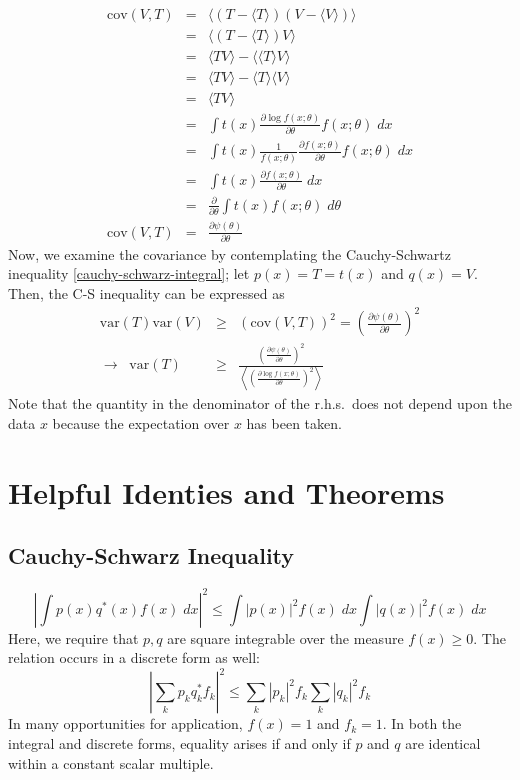 \begin{eqnarray}
\textrm{cov}(V,T) &=& \langle (T - \langle T \rangle)(V - \langle V
\rangle)\rangle \\
&=& \langle (T - \langle T \rangle) V\rangle \\
&=& \langle T V \rangle - \langle \langle T \rangle V\rangle \\
&=& \langle T V \rangle - \langle T \rangle \langle V\rangle \\
&=& \langle T V \rangle \\
&=& \int t(x) \frac{\partial \log f(x; \theta)}{\partial \theta} f(x;
\theta)\; dx \\
&=& \int t(x) \frac{1}{f(x; \theta)} \frac{\partial f(x;
  \theta)}{\partial \theta} f(x; \theta) \; dx \\
&=& \int t(x) \frac{\partial f(x; \theta)}{\partial \theta} \; dx \\
&=& \frac{\partial}{\partial \theta} \int t(x) f(x; \theta) \; d\theta \\
\textrm{cov}(V,T) &=& \frac{\partial \psi(\theta)}{\partial \theta}
\end{eqnarray}
Now, we examine the covariance by contemplating the Cauchy-Schwartz
inequality \eqref{cauchy-schwarz-integral}; let $p(x) = T = t(x)$ and
$q(x) = V$.  Then, the C-S inequality can be expressed as
\begin{eqnarray}
\textrm{var}(T) \textrm{var}(V) &\ge& \left(\textrm{cov}(V,T)\right)^2
= \left(\frac{\partial \psi(\theta)}{\partial \theta} \right)^2 \\
\rightarrow \;\; \textrm{var}(T) &\ge& 
\frac{\left(\frac{\partial \psi(\theta)}{\partial \theta}\right)^2}
     {\left\langle \left(\frac{\partial \log f(x; \theta)}{\partial \theta}\right)^2\right\rangle}
\end{eqnarray}
Note that the quantity in the denominator of the r.h.s.~does not
depend upon the data $x$ because the expectation over $x$ has been taken.

\chapter{Helpful Identies and Theorems}

\section{Cauchy-Schwarz Inequality}

\begin{equation} \label{e:cauchy-schwarz-integral}
\left| \int p(x) q^\ast(x) f(x) \; dx \right|^2 \le 
\int |p(x)|^2 f(x) \; dx \int |q(x)|^2 f(x) \; dx 
\end{equation}
Here, we require that $p, q$ are square integrable over the measure
$f(x) \ge 0$.  The relation occurs in a discrete form as well:
\begin{equation}
\left| \sum_k p_k q_k^\ast f_k \right|^2 \le
  \sum_k |p_k|^2 f_k \sum_k |q_k|^2 f_k
\end{equation}
In many opportunities for application, $f(x) = 1$ and $f_k = 1$.  In
both the integral and discrete forms, equality arises if and only if
$p$ and $q$ are identical within a constant scalar multiple.

